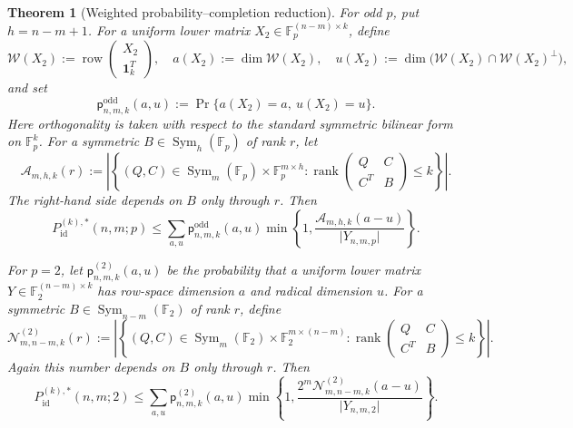 \documentclass[11pt]{article}
\newcommand{\F}{\mathbb F}
\newcommand{\Sym}{\operatorname{Sym}}
\newcommand{\rank}{\operatorname{rank}}
\newcommand{\1}{\mathbf 1}
\theoremstyle{plain}
\newtheorem{theorem}{Theorem}[section]
\theoremstyle{definition}
\theoremstyle{remark}
\begin{document}
\begin{theorem}[Weighted probability--completion reduction]
\label{thm:converse-weighted-probability-completion-reduction}
For odd $p$, put $h=n-m+1$.  For a uniform lower matrix
$X_2\in\F_p^{(n-m)\times k}$, define
\begin{equation}
 \mathcal W(X_2):=\operatorname{row}
 \begin{pmatrix}X_2\\ \1_k^T\end{pmatrix},
 \quad a(X_2):=\dim\mathcal W(X_2),
 \quad u(X_2):=\dim\bigl(\mathcal W(X_2)\cap\mathcal W(X_2)^\perp\bigr),
 \label{eq:main-odd-lower-realization-row-space-pair}
\end{equation}
and set
\begin{equation}
 \mathsf p_{n,m,k}^{\mathrm{odd}}(a,u)
 :=\Pr\{a(X_2)=a,\ u(X_2)=u\}.
 \label{eq:main-odd-lower-realization-mass-function}
\end{equation}
Here orthogonality is taken with respect to the standard symmetric bilinear
form on $\F_p^k$.  For a symmetric
$B\in\Sym_h(\F_p)$ of rank $r$, let
\begin{equation}
 \mathcal A_{m,h,k}(r)
 :=\left|\left\{(Q,C)\in\Sym_m(\F_p)\times\F_p^{m\times h}:
 \rank\begin{pmatrix}Q&C\\C^T&B\end{pmatrix}\le k\right\}\right|.
 \label{eq:main-odd-completion-count-interface}
\end{equation}
The right-hand side depends on $B$ only through $r$.  Then
\begin{equation}
 P_{\mathrm{id}}^{(k),*}(n,m;p)
 \le
 \sum_{a,u}\mathsf p_{n,m,k}^{\mathrm{odd}}(a,u)
 \min\left\{1,
 \frac{\mathcal A_{m,h,k}(a-u)}{\lvert Y_{n,m,p}\rvert}\right\}.
 \label{eq:main-odd-weighted-completion-interface}
\end{equation}

For $p=2$, let $\mathsf p_{n,m,k}^{(2)}(a,u)$ be the probability that a
uniform lower matrix $Y\in\F_2^{(n-m)\times k}$ has row-space dimension $a$
and radical dimension $u$.  For a symmetric
$B\in\Sym_{n-m}(\F_2)$ of rank $r$, define
\begin{equation}
 \mathcal N_{m,n-m,k}^{(2)}(r)
 :=\left|\left\{(Q,C)\in\Sym_m(\F_2)
 \times\F_2^{m\times(n-m)}:
 \rank\begin{pmatrix}Q&C\\C^T&B\end{pmatrix}\le k\right\}\right|.
 \label{eq:main-binary-completion-count-interface}
\end{equation}
Again this number depends on $B$ only through $r$.  Then
\begin{equation}
 P_{\mathrm{id}}^{(k),*}(n,m;2)
 \le
 \sum_{a,u}\mathsf p_{n,m,k}^{(2)}(a,u)
 \min\left\{1,
 \frac{2^m\mathcal N_{m,n-m,k}^{(2)}(a-u)}{\lvert Y_{n,m,2}\rvert}
 \right\}.
 \label{eq:main-binary-weighted-completion-interface}
\end{equation}
\end{theorem}
\end{document}
